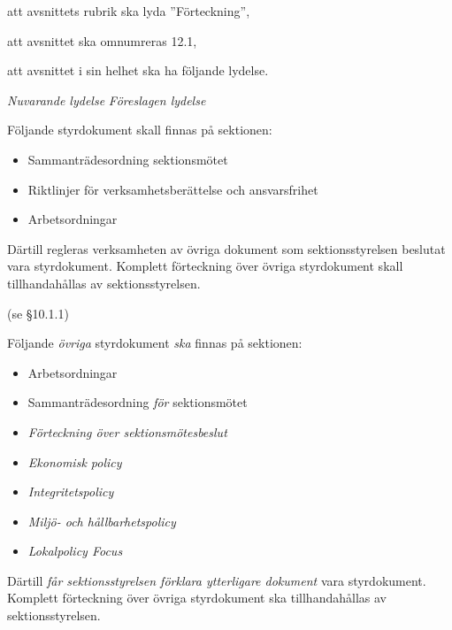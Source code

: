 \documentclass{article}
\newenvironment{lydelse}
    {\begin{paracol}{2}%
        \emph{Nuvarande lydelse}%
        \switchcolumn%
        \emph{Föreslagen lydelse}%
    \end{paracol}%
    \begin{enumerate}[label=\thesubsection.\arabic*]%
    \begin{paracol}{2}%
    }{\end{paracol}\end{enumerate}}
\begin{document}
\begin{dels}
    \item att avsnittets rubrik ska lyda ''Förteckning'',
    \item att avsnittet ska omnumreras 12.1,
    \item att avsnittet i sin helhet ska ha följande lydelse.
\end{dels}
\begin{lydelse}
    
    \setcounter{section}{10}
    
    \item Följande styrdokument skall finnas på sektionen:
	\begin{itemize}
		\item Sammanträdesordning sektionsmötet
		\item Riktlinjer för verksamhetsberättelse och ansvarsfrihet
		\item Arbetsordningar
	\end{itemize}
    Därtill regleras verksamheten av övriga dokument som sektionsstyrelsen beslutat vara styrdokument. Komplett förteckning över övriga styrdokument skall tillhandahållas av sektionsstyrelsen.

    \vspace{1.4em}
    \item[] (se \S 10.1.1)
    
    \setcounter{section}{12}
    \switchcolumn
  
    \item Följande \emph{övriga} styrdokument \emph{ska} finnas på sektionen:
    \label{R:ForteckningStyrdokument}
    \begin{itemize}
        \item Arbetsordningar
        \item Sammanträdesordning \emph{för} sektionsmötet
        \item \emph{Förteckning över sektionsmötesbeslut}
        \item \emph{Ekonomisk policy}
        \item \emph{Integritetspolicy}
        \item \emph{Miljö- och hållbarhetspolicy}
        \item \emph{Lokalpolicy Focus}
    \end{itemize}
    
    \item Därtill \emph{får sektionsstyrelsen förklara ytterligare dokument} vara styrdokument.
    Komplett förteckning över övriga styrdokument ska tillhandahållas av sektionsstyrelsen.

\end{lydelse}
\end{document}

